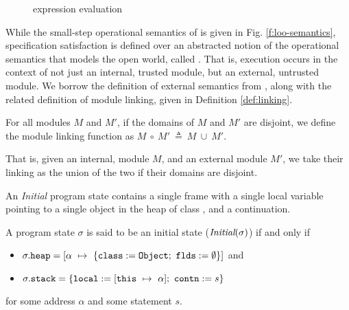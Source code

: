 \begin{figure}[t]
\begin{minipage}{\textwidth}
\begin{minipage}{\textwidth}
\caption{\LangOO expression evaluation}
\label{f:evaluation}
\end{minipage}
\end{minipage}
\end{figure}

While the small-step operational semantics of \LangOO is given in Fig. \ref{f:loo-semantics},
specification satisfaction is defined over an abstracted notion of 
the operational semantics that models the open world, called . 
That is, execution occurs in the context of not just an internal, trusted module, but 
an external, untrusted module. We borrow the definition of external  semantics 
from \citeauthor{FASE}, along with the related definition of module linking, given in Definition \ref{def:linking}.
\begin{definition}
\label{def:linking}
For all modules $M$ and $M'$, if the domains of $M$ and $M'$ are disjoint, 
we define the module linking function as $M\ \circ\ M'\ \triangleq\ M\ \cup\ M'$.
\end{definition}
That is, given an internal, module $M$, and an external module $M'$, 
we take their linking as the union of the two if their domains are disjoint.



An \emph{Initial} program state contains a single frame 
with a single local variable  pointing to a single object 
in the heap of class , and a continuation.
\begin{definition}
\label{def:initial}
A program state $\sigma$ is said to be an initial state ($\textit{Initial}(\sigma)$)
if and only if
\begin{itemize}
\item
$\sigma.\prg{heap} = [\alpha\ \mapsto\ \{\prg{class}:=\prg{Object};\ \prg{flds}:=\emptyset\}]$ and
\item
$\sigma.\mbox{\normalfont{\texttt{stack}}} = \{\mbox{\normalfont{\texttt{local}}}:=[\mbox{\normalfont{\texttt{this}}}\ \mapsto\ \alpha];\ \mbox{\normalfont{\texttt{contn}}}:= s\}$
\end{itemize} 
for some address $\alpha$ and some statement $s$.
\end{definition}


